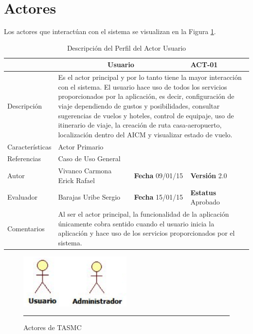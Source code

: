 \section{Actores}

Los actores que interactúan con el sistema se visualizan en la Figura \ref{fig:actoresTASMC}.

\begin{table}[htbp]
	\begin{center}
		\begin{tabular}{|p{2.5cm}|p{6.4cm}|p{2cm}|p{2cm}|}
			\hline
				\rowcolor[RGB]{51,153,255}{Actor}&\multicolumn{2}{c}{Usuario}&{\textbf{ACT-01}}\\
			\hline
				{Descripción}&\multicolumn{3}{p{11.2cm}|}{
			Es el actor principal y por lo tanto tiene la mayor interacción con el sistema. El usuario hace uso de todos 				los servicios proporcionados por la aplicación, es decir, configuración de viaje dependiendo de gustos y 					posibilidades, consultar sugerencias de vuelos y hoteles, control de equipaje, uso de itinerario de viaje, la 				creación de ruta casa-aeropuerto, localización dentro del AICM y visualizar estado de vuelo.}\\
			\hline
				{Características}&\multicolumn{3}{p{11.2cm}|}{Actor Primario}\\
			\hline
				{Referencias}&\multicolumn{3}{p{11.2cm}|}{Caso de Uso General}\\
			\hline
				{Autor}&{Vivanco Carmona Erick Rafael}&{\textbf{Fecha} 09/01/15}&{\textbf{Versión} 2.0}\\
			\hline
				{Evaluador}&{Barajas Uribe Sergio}&{\textbf{Fecha} 15/01/15}&{\textbf{Estatus} Aprobado}\\
			\hline
				{Comentarios}&\multicolumn{3}{p{11.2cm}|}{Al ser el actor principal, la funcionalidad de la aplicación 						únicamente cobra sentido cuando el usuario inicia la aplicación y hace uso de los servicios 										proporcionados por el sistema.}\\
			\hline
		\end{tabular}
	\end{center}
	\caption[Descripción del Perfil del Actor Usuario]{Descripción del Perfil del Actor Usuario}
    	\label{tab:perfilUsuario}
\end{table}

\begin{figure}[htbp]
	\centering
		\includegraphics[width=0.5\textwidth]{Figuras/actores.png}
		\rule{30em}{0.5pt}
	\caption[Actores de TASMC]{Actores de TASMC}
	\label{fig:actoresTASMC}
\end{figure}

